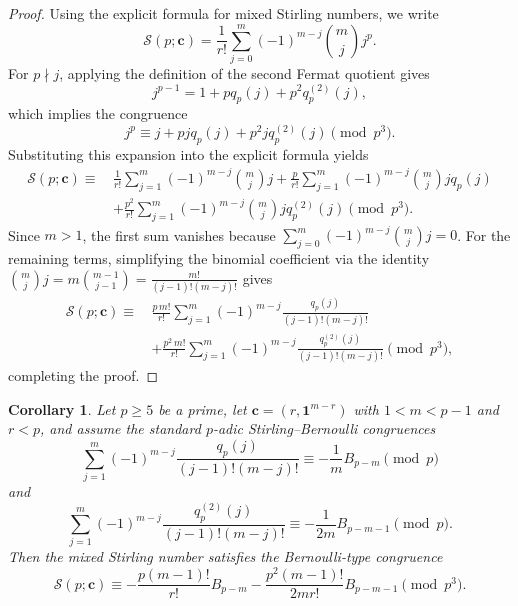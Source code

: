 \documentclass[12pt]{amsart}
\newtheorem{corollary}[theorem]{Corollary}
\theoremstyle{definition}
\begin{document}
\begin{proof}
Using the explicit formula for mixed Stirling numbers, we write
\[
\mathcal{S}(p; \mathbf{c})
=
\frac{1}{r!}
\sum_{j=0}^{m}
(-1)^{m-j} \binom{m}{j} j^p.
\]
For $p \nmid j$, applying the definition of the second Fermat quotient gives
\[
j^{p-1} = 1 + p q_p(j) + p^2 q_p^{(2)}(j),
\]
which implies the congruence
\[
j^p \equiv j + p j q_p(j) + p^2 j q_p^{(2)}(j) \pmod{p^3}.
\]
Substituting this expansion into the explicit formula yields
\begin{align}
\mathcal{S}(p; \mathbf{c})
\equiv\,&
\frac{1}{r!} \sum_{j=1}^{m} (-1)^{m-j} \binom{m}{j} j
+
\frac{p}{r!} \sum_{j=1}^{m} (-1)^{m-j} \binom{m}{j} j q_p(j)
\nonumber\\
&+
\frac{p^2}{r!} \sum_{j=1}^{m} (-1)^{m-j} \binom{m}{j} j q_p^{(2)}(j)
\pmod{p^3}.
\end{align}
Since $m > 1$, the first sum vanishes because $\sum_{j=0}^{m} (-1)^{m-j} \binom{m}{j} j = 0$. For the remaining terms, simplifying the binomial coefficient via the identity $\binom{m}{j} j = m \binom{m-1}{j-1} = \frac{m!}{(j-1)!(m-j)!}$ gives
\begin{align}
\mathcal{S}(p; \mathbf{c})
\equiv\,&
\frac{p \, m!}{r!}
\sum_{j=1}^{m}
(-1)^{m-j}
\frac{q_p(j)}{(j-1)!(m-j)!}
\nonumber\\
&+
\frac{p^2 \, m!}{r!}
\sum_{j=1}^{m}
(-1)^{m-j}
\frac{q_p^{(2)}(j)}{(j-1)!(m-j)!}
\pmod{p^3},
\end{align}
completing the proof.
\end{proof}
\begin{corollary}
\label{cor:p3_bernoulli_mixed}
Let $p \ge 5$ be a prime, let $\mathbf{c} = (r, \mathbf{1}^{m-r})$ with $1 < m < p-1$ and $r < p$, and assume the standard $p$-adic Stirling--Bernoulli congruences
\[
\sum_{j=1}^{m} (-1)^{m-j} \frac{q_p(j)}{(j-1)!(m-j)!} \equiv -\frac{1}{m} B_{p-m} \pmod p
\]
and
\[
\sum_{j=1}^{m} (-1)^{m-j} \frac{q_p^{(2)}(j)}{(j-1)!(m-j)!} \equiv -\frac{1}{2m} B_{p-m-1} \pmod p.
\]
Then the mixed Stirling number satisfies the Bernoulli-type congruence
\begin{equation}
\label{eq:p3_bernoulli}
\mathcal{S}(p; \mathbf{c})
\equiv
-\frac{p(m-1)!}{r!} B_{p-m}
-
\frac{p^2(m-1)!}{2mr!} B_{p-m-1}
\pmod{p^3}.
\end{equation}
\end{corollary}
\end{document}
